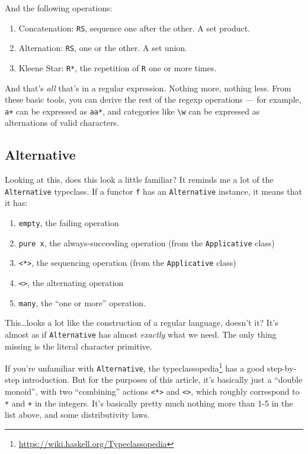 \documentclass[]{article}
\renewcommand{\href}[2]{#2\footnote{\url{#1}}}
\begin{document}
And the following operations:

\begin{enumerate}
\def\labelenumi{\arabic{enumi}.}
\tightlist
\item
  Concatenation: \texttt{RS}, sequence one after the other. A set product.
\item
  Alternation: \texttt{R\textbar{}S}, one or the other. A set union.
\item
  Kleene Star: \texttt{R*}, the repetition of \texttt{R} one or more times.
\end{enumerate}

And that's \emph{all} that's in a regular expression. Nothing more, nothing
less. From these basic tools, you can derive the rest of the regexp operations
--- for example, \texttt{a+} can be expressed as \texttt{aa*}, and categories
like \texttt{\textbackslash{}w} can be expressed as alternations of valid
characters.

\hypertarget{alternative}{%
\subsection{Alternative}\label{alternative}}

Looking at this, does this look a little familiar? It reminds me a lot of the
\texttt{Alternative} typeclass. If a functor \texttt{f} has an
\texttt{Alternative} instance, it means that it has:

\begin{enumerate}
\def\labelenumi{\arabic{enumi}.}
\tightlist
\item
  \texttt{empty}, the failing operation
\item
  \texttt{pure\ x}, the always-succeeding operation (from the
  \texttt{Applicative} class)
\item
  \texttt{\textless{}*\textgreater{}}, the sequencing operation (from the
  \texttt{Applicative} class)
\item
  \texttt{\textless{}\textbar{}\textgreater{}}, the alternating operation
\item
  \texttt{many}, the ``one or more'' operation.
\end{enumerate}

This\ldots{}looks a lot like the construction of a regular language, doesn't it?
It's almost as if \texttt{Alternative} has almost \emph{exactly} what we need.
The only thing missing is the literal character primitive.

If you're unfamiliar with \texttt{Alternative}, the
\href{https://wiki.haskell.org/Typeclassopedia}{typeclassopedia} has a good
step-by-step introduction. But for the purposes of this article, it's basically
just a ``double monoid'', with two ``combining'' actions
\texttt{\textless{}*\textgreater{}} and
\texttt{\textless{}\textbar{}\textgreater{}}, which roughly correspond to
\texttt{*} and \texttt{+} in the integers. It's basically pretty much nothing
more than 1-5 in the list above, and some distributivity laws.
\end{document}
